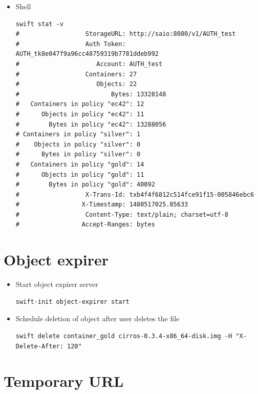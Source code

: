 \documentclass{article}
\begin{document}
\begin{itemize}
\begin{itemize}
\item Shell
\begin{verbatim}
swift stat -v
#     			   StorageURL: http://saio:8080/v1/AUTH_test
#     			   Auth Token: AUTH_tk8e047f9a96cc48759319b7781ddeb992
#     				  Account: AUTH_test
#     			   Containers: 27
#     				  Objects: 22
#                         Bytes: 13328148
#   Containers in policy "ec42": 12
#      Objects in policy "ec42": 11
#        Bytes in policy "ec42": 13288056
# Containers in policy "silver": 1
#    Objects in policy "silver": 0
#      Bytes in policy "silver": 0
#   Containers in policy "gold": 14
#      Objects in policy "gold": 11
#        Bytes in policy "gold": 40092
#     			   X-Trans-Id: txb4f4f6812c514fce91f15-005846ebc6
#     			  X-Timestamp: 1480517025.85633
#                  Content-Type: text/plain; charset=utf-8
#                 Accept-Ranges: bytes
\end{verbatim}
\end{itemize}
\end{itemize}

\section{Object expirer}
\label{sec:orgbc82134}

\begin{itemize}
\item Start object expirer server

\begin{verbatim}
swift-init object-expirer start
\end{verbatim}

\item Schedule deletion of object after user deletes the file

\begin{verbatim}
swift delete container_gold cirros-0.3.4-x86_64-disk.img -H "X-Delete-After: 120"
\end{verbatim}
\end{itemize}

\section{Temporary URL}
\label{sec:orgf10100e}
\end{document}

